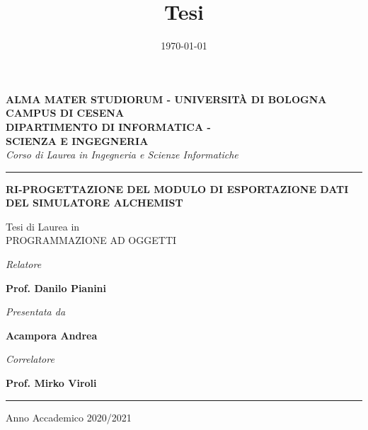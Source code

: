 \title{Tesi}
\date{\today}

\begin{titlepage}
    \begin{center}

\large
\textbf{ALMA MATER STUDIORUM - UNIVERSITÀ DI BOLOGNA} \\
\textbf{CAMPUS DI CESENA} \\
\vspace{0.5cm}
\textbf{DIPARTIMENTO DI INFORMATICA -\\ SCIENZA E INGEGNERIA}\\
\vspace{0.5cm}
\Large
\textit{Corso di Laurea in Ingegneria e Scienze Informatiche} \\


\vspace{0.7cm}
\noindent\rule{\textwidth}{0.7pt}


\vspace{2.5cm}

\large{\textbf{\MakeUppercase{
Ri-progettazione del modulo di esportazione dati del simulatore Alchemist
}}}

\vspace{2cm}

Tesi di Laurea in \\
PROGRAMMAZIONE AD OGGETTI


\vspace{3cm}

\begin{minipage}[t]{7cm}
\flushleft
\textit{{Relatore}}

\textbf{Prof. Danilo Pianini}\\
\end{minipage}
\hfill
\begin{minipage}[t]{7cm}
\flushright
\textit{Presentata da}

\textbf{Acampora Andrea}
\end{minipage}

\flushleft
\textit{{Correlatore}}

\textbf{Prof. Mirko Viroli} \\

\vspace{3cm}
\noindent\rule{\textwidth}{0.7pt}
\vspace{1cm}

\centering
Anno Accademico 2020/2021
    \end{center}
\end{titlepage}
\restoregeometry


